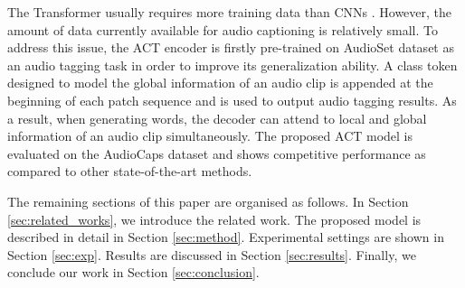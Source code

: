 \documentclass{article}
\begin{document}
\begin{sloppy}
The Transformer usually requires more training data than CNNs \cite{dosovitskiy2020image}. However, the amount of data currently available for audio captioning is relatively small. To address this issue, the ACT encoder is firstly pre-trained on AudioSet dataset \cite{audioset} as an audio tagging task in order to improve its generalization ability. A class token designed to model the global information of an audio clip is appended at the beginning of each patch sequence and is used to output audio tagging results. As a result, when generating words, the decoder can attend to local and global information of an audio clip simultaneously. The proposed ACT model is evaluated on the AudioCaps dataset \cite{kim2019audiocaps} and shows competitive performance as compared to other state-of-the-art methods. 

The remaining sections of this paper are organised as follows. In Section \ref{sec:related_works}, we introduce the related work. The proposed model is described in detail in Section \ref{sec:method}. Experimental settings are shown in Section \ref{sec:exp}. Results are discussed in Section \ref{sec:results}. Finally, we conclude our work in Section \ref{sec:conclusion}.






\end{sloppy}
\end{document}
